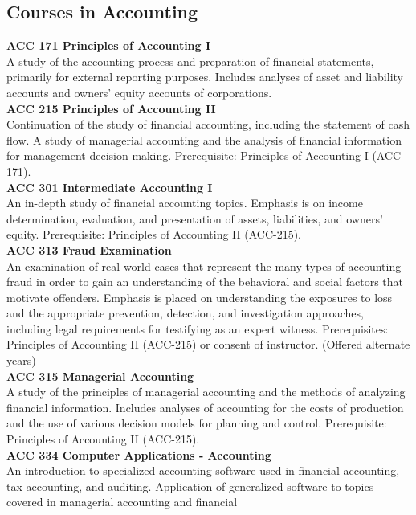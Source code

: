 \documentclass[
  letterpaper,
]{scrbook}
\begin{document}
\subsection{Courses in Accounting}\label{courses-in-accounting}

\textbf{ACC 171 Principles of Accounting I}\\
A study of the accounting process and preparation of financial
statements, primarily for external reporting purposes. Includes analyses
of asset and liability accounts and owners' equity accounts of
corporations.\\
\textbf{ACC 215 Principles of Accounting II}\\
Continuation of the study of financial accounting, including the
statement of cash flow. A study of managerial accounting and the
analysis of financial information for management decision making.
Prerequisite: Principles of Accounting I (ACC-171).\\
\textbf{ACC 301 Intermediate Accounting I}\\
An in-depth study of financial accounting topics. Emphasis is on income
determination, evaluation, and presentation of assets, liabilities, and
owners' equity. Prerequisite: Principles of Accounting II (ACC-215).\\
\textbf{ACC 313 Fraud Examination}\\
An examination of real world cases that represent the many types of
accounting fraud in order to gain an understanding of the behavioral and
social factors that motivate offenders. Emphasis is placed on
understanding the exposures to loss and the appropriate prevention,
detection, and investigation approaches, including legal requirements
for testifying as an expert witness. Prerequisites: Principles of
Accounting II (ACC-215) or consent of instructor. (Offered alternate
years)\\
\textbf{ACC 315 Managerial Accounting}\\
A study of the principles of managerial accounting and the methods of
analyzing financial information. Includes analyses of accounting for the
costs of production and the use of various decision models for planning
and control. Prerequisite: Principles of Accounting II (ACC-215).\\
\textbf{ACC 334 Computer Applications - Accounting}\\
An introduction to specialized accounting software used in financial
accounting, tax accounting, and auditing. Application of generalized
software to topics covered in managerial accounting and financial
\end{document}
